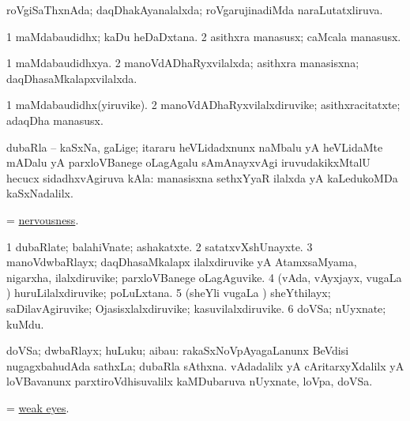 \bentry
{} 
\gl{\gu}
\bmng
roVgiSaThxnAda; daqDhakAyanalalxda; roVgarujinadiMda naraLutatxliruva. 
\emng
\eentry

\bentry
{} 
\gl{\nA}
\expl{}
\bmng
\bnum
\num{1} maMdabaudidhx; kaDu heDaDxtana. 
\num{2} asithxra manasusx; caMcala manasusx. 
\enum
\emng
\eentry

\bentry
{} 
\gl{\gu}
\expl{}
\bmng
\bnum
\num{1} maMdabaudidhxya. 
\num{2} manoVdADhaRyxvilalxda; asithxra manasisxna; daqDhasaMkalapxvilalxda. 
\enum
\emng
\eentry

\bentry
{} 
\gl{\nA}
\expl{}
\bmng
\bnum
\num{1} maMdabaudidhx(yiruvike). 
\num{2} manoVdADhaRyxvilalxdiruvike; asithxracitatxte; adaqDha manasusx. 
\enum
\emng
\eentry

\bentry
{} 
\gl{\nA}
\bmng
dubaRla -- kaSxNa, gaLige; itararu heVLidadxnunx naMbalu yA heVLidaMte mADalu yA parxloVBanege oLagAgalu sAmAnayxvAgi iruvudakikxMtalU hecucx sidadhxvAgiruva kAla:  manasisxna sethxYyaR ilalxda yA kaLedukoMDa kaSxNadalilx. 
\emng
\eentry

\bentry
{}
\gl{\nA}
\bmng
= \hyperref{kandict_n.pdf}{N}{nervousness}{nervousness}. 
\emng
\eentry

\bentry
{} 
\gl{\nA}
\expl{}
\bmng
\bnum
\num{1} dubaRlate; balahiVnate; ashakatxte. 
\num{2} satatxvXshUnayxte. 
\num{3} manoVdwbaRlayx; daqDhasaMkalapx ilalxdiruvike yA AtamxsaMyama, nigarxha, ilalxdiruvike; parxloVBanege oLagAguvike. 
\num{4} (vAda, vAyxjayx, \mo vugaLa \vi) huruLilalxdiruvike; poLuLxtana. 
\num{5} (sheYli \mo vugaLa \vi) sheYthilayx; saDilavAgiruvike; Ojasisxlalxdiruvike; kasuvilalxdiruvike. 
\num{6} doVSa; nUyxnate; kuMdu. 
\enum
\emng
\eentry

\bentry
{} 
\gl{\nA}
\expl{}
\bmng
doVSa; dwbaRlayx; huLuku; aibau: 
\banum
{} rakaSxNoVpAyagaLanunx BeVdisi nugagxbahudAda sathxLa; dubaRla sAthxna. 
 vAdadalilx yA cAritarxyXdalilx yA loVBavanunx parxtiroVdhisuvalilx kaMDubaruva nUyxnate, loVpa, doVSa. 
\eanum
\emng
\eentry

\bentry
{} 
\gl{\nA}
\expl{}
\bmng
= \hyperlink{weak eyes}{weak eyes}. 
\emng
\eentry

